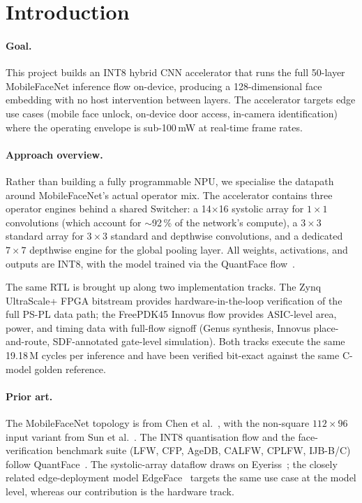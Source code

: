 \section{Introduction}
\label{sec:intro}

\paragraph{Goal.} This project builds an INT8 hybrid CNN accelerator that runs the full 50-layer MobileFaceNet inference flow on-device, producing a 128-dimensional face embedding with no host intervention between layers. The accelerator targets edge use cases (mobile face unlock, on-device door access, in-camera identification) where the operating envelope is sub-100\,mW at real-time frame rates.

\paragraph{Approach overview.} Rather than building a fully programmable NPU, we specialise the datapath around MobileFaceNet's actual operator mix. The accelerator contains three operator engines behind a shared Switcher: a 14$\times$16 systolic array for $1\times1$ convolutions (which account for $\sim$92\,\% of the network's compute), a $3\times3$ standard array for $3\times3$ standard and depthwise convolutions, and a dedicated $7\times7$ depthwise engine for the global pooling layer. All weights, activations, and outputs are INT8, with the model trained via the QuantFace flow~\cite{9955645}.

The same RTL is brought up along two implementation tracks. The Zynq UltraScale+ FPGA bitstream provides hardware-in-the-loop verification of the full PS-PL data path; the FreePDK45 Innovus flow provides ASIC-level area, power, and timing data with full-flow signoff (Genus synthesis, Innovus place-and-route, SDF-annotated gate-level simulation). Both tracks execute the same 19.18\,M cycles per inference and have been verified bit-exact against the same C-model golden reference.

\paragraph{Prior art.} The MobileFaceNet topology is from Chen et al.~\cite{chen2018mobilefacenetsefficientcnnsaccurate}, with the non-square $112\times96$ input variant from Sun et al.~\cite{Linjun_SUN20202019EDL8103}. The INT8 quantisation flow and the face-verification benchmark suite (LFW, CFP, AgeDB, CALFW, CPLFW, IJB-B/C) follow QuantFace~\cite{9955645}. The systolic-array dataflow draws on Eyeriss~\cite{7738524}; the closely related edge-deployment model EdgeFace~\cite{george2024edgefaceefficientfacerecognition} targets the same use case at the model level, whereas our contribution is the hardware track.

